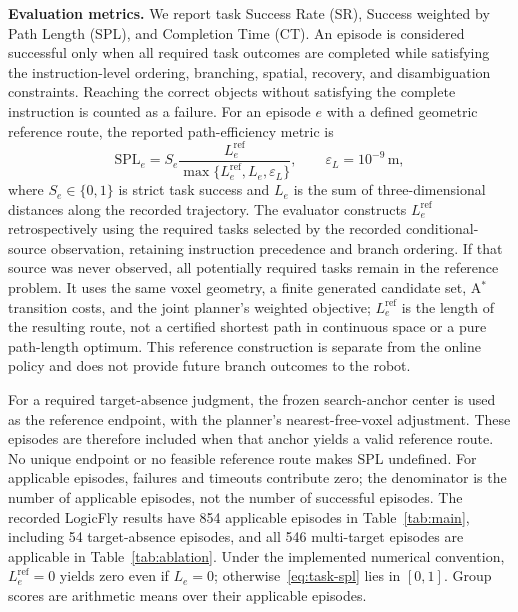 \documentclass[letterpaper,10pt,journal]{IEEEtran}
\begin{document}
\textbf{Evaluation metrics.}
We report task Success Rate (SR), Success weighted by Path Length (SPL), and Completion Time (CT). An episode is considered successful only when all required task outcomes are completed while satisfying the instruction-level ordering, branching, spatial, recovery, and disambiguation constraints. Reaching the correct objects without satisfying the complete instruction is counted as a failure. For an episode $e$ with a defined geometric reference route, the reported path-efficiency metric is
\begin{equation}
\mathrm{SPL}_e=S_e\frac{L_e^{\mathrm{ref}}}
{\max\{L_e^{\mathrm{ref}},L_e,\varepsilon_L\}},
\qquad \varepsilon_L=10^{-9}\,\mathrm m,
\label{eq:task-spl}
\end{equation}
where $S_e\in\{0,1\}$ is strict task success and $L_e$ is the sum of three-dimensional distances along the recorded trajectory. The evaluator constructs $L_e^{\mathrm{ref}}$ retrospectively using the required tasks selected by the recorded conditional-source observation, retaining instruction precedence and branch ordering. If that source was never observed, all potentially required tasks remain in the reference problem. It uses the same voxel geometry, a finite generated candidate set, A$^*$ transition costs, and the joint planner's weighted objective; $L_e^{\mathrm{ref}}$ is the length of the resulting route, not a certified shortest path in continuous space or a pure path-length optimum. This reference construction is separate from the online policy and does not provide future branch outcomes to the robot.

For a required target-absence judgment, the frozen search-anchor center is used as the reference endpoint, with the planner's nearest-free-voxel adjustment. These episodes are therefore included when that anchor yields a valid reference route. No unique endpoint or no feasible reference route makes SPL undefined. For applicable episodes, failures and timeouts contribute zero; the denominator is the number of applicable episodes, not the number of successful episodes. The recorded LogicFly results have 854 applicable episodes in Table~\ref{tab:main}, including 54 target-absence episodes, and all 546 multi-target episodes are applicable in Table~\ref{tab:ablation}. Under the implemented numerical convention, $L_e^{\mathrm{ref}}=0$ yields zero even if $L_e=0$; otherwise~\eqref{eq:task-spl} lies in $[0,1]$. Group scores are arithmetic means over their applicable episodes.
\end{document}
